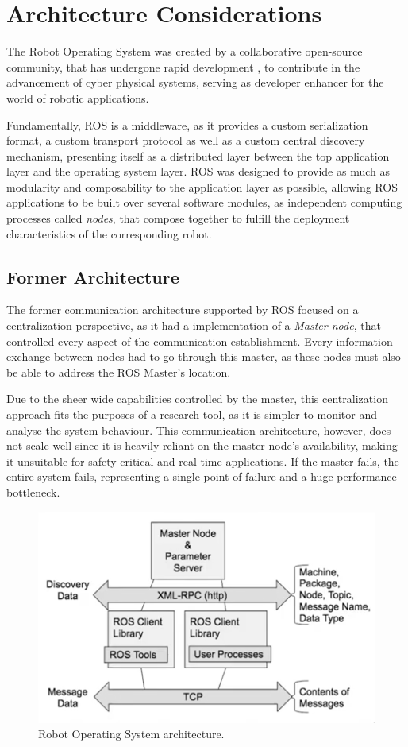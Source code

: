 \section{Architecture Considerations}

The Robot Operating System was created by a collaborative open-source community, that has undergone rapid development \cite{cousins2011exponential}, to contribute in the advancement of cyber physical systems, serving as developer enhancer for the world of robotic applications. \cite{diluoffo2018robot, intro-ros}

Fundamentally, ROS is a middleware, as it provides a custom serialization format, a custom transport protocol as well as a custom central discovery mechanism, presenting itself as a distributed layer between the top application layer and the operating system layer. ROS was designed to provide as much as modularity and composability to the application layer \cite{casini2019response} as possible, allowing ROS applications to be built over several software modules, as independent computing processes called \textit{nodes}, that compose together to fulfill the deployment characteristics of the corresponding robot. \cite{maruyama2016exploring} 

\subsection{Former Architecture}

The former communication architecture supported by ROS focused on a centralization perspective, as it had a implementation of a \textit{Master node}, that controlled every aspect of the communication establishment. Every information exchange between nodes had to go through this master, as these nodes must also be able to address the ROS Master's location.

Due to the sheer wide capabilities controlled by the master, this centralization approach fits the purposes of a research tool, as it is simpler to monitor and analyse the system behaviour. This communication architecture, however, does not scale well since it is heavily reliant on the master node's availability, making it unsuitable for safety-critical and real-time applications. If the master fails, the entire system fails, representing a single point of failure and a huge performance bottleneck.

\begin{figure}[H]
  \centering
  \includegraphics[width=0.6\linewidth]{images/former-ros1-architecture.png}
  \caption{Robot Operating System architecture.}
  \label{fig:ros1-architecture}
\end{figure}

